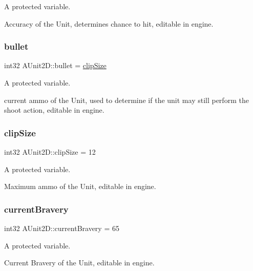 A protected variable. 

Accuracy of the Unit, determines chance to hit, editable in engine. \hypertarget{class_a_unit2_d_a7f23a4544c24d5fd0489f2420a7b3eb4}{}\label{class_a_unit2_d_a7f23a4544c24d5fd0489f2420a7b3eb4} 
\subsubsection{\texorpdfstring{bullet}{bullet}}
{\footnotesize\ttfamily int32 A\+Unit2\+D\+::bullet = \hyperlink{class_a_unit2_d_a7947b8f9bed2225ed223f37f21820960}{clip\+Size}\hspace{0.3cm}{\ttfamily [protected]}}



A protected variable. 

current ammo of the Unit, used to determine if the unit may still perform the shoot action, editable in engine. \hypertarget{class_a_unit2_d_a7947b8f9bed2225ed223f37f21820960}{}\label{class_a_unit2_d_a7947b8f9bed2225ed223f37f21820960} 
\subsubsection{\texorpdfstring{clip\+Size}{clipSize}}
{\footnotesize\ttfamily int32 A\+Unit2\+D\+::clip\+Size = 12\hspace{0.3cm}{\ttfamily [protected]}}



A protected variable. 

Maximum ammo of the Unit, editable in engine. \hypertarget{class_a_unit2_d_aee9f4f0703e027df353d51811befb1c3}{}\label{class_a_unit2_d_aee9f4f0703e027df353d51811befb1c3} 
\subsubsection{\texorpdfstring{current\+Bravery}{currentBravery}}
{\footnotesize\ttfamily int32 A\+Unit2\+D\+::current\+Bravery = 65\hspace{0.3cm}{\ttfamily [protected]}}



A protected variable. 

Current Bravery of the Unit, editable in engine. \hypertarget{class_a_unit2_d_a24f6252522a9d97f9ea8ea9cbf6cca69}{}\label{class_a_unit2_d_a24f6252522a9d97f9ea8ea9cbf6cca69} 
